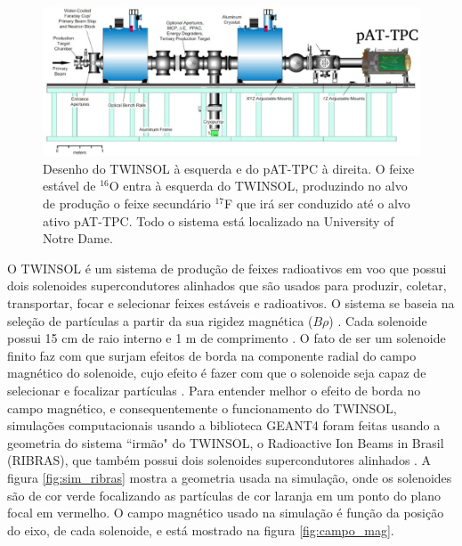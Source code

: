 \documentclass[a4paper,12pt,oneside]{book}
\begin{document}
\begin{figure}[H]
    \centering
    \includegraphics[scale = 0.35]{figs/poster3.jpeg}
    \caption{Desenho do TWINSOL à esquerda e do pAT-TPC à direita. O feixe estável de $^{16}$O entra à esquerda do TWINSOL, produzindo no alvo de produção o feixe secundário $^{17}$F que irá ser conduzido até o alvo ativo pAT-TPC. Todo o sistema está localizado na University of Notre Dame.}
    \label{fig:twinsol+pattpc}
\end{figure}

\par O TWINSOL é um sistema de produção de feixes radioativos em voo que possui dois solenoides supercondutores alinhados que são usados para produzir, coletar, transportar, focar e selecionar feixes estáveis e radioativos. O sistema se baseia na seleção de partículas a partir da sua rigidez magnética ($B\rho$) \cite{twinsol, ribras_leo, zamora_mater}. Cada solenoide possui 15 cm de raio interno e 1 m de comprimento \cite{twinsol}. O fato de ser um solenoide finito faz com que surjam efeitos de borda na componente radial do campo magnético do solenoide, cujo efeito é fazer com que o solenoide seja capaz de selecionar e focalizar partículas \cite{ribras_leo}. Para entender melhor o efeito de borda no campo magnético, e consequentemente o funcionamento do TWINSOL, simulações computacionais usando a biblioteca GEANT4 \cite{geant4} foram feitas usando a geometria do sistema ``irmão" do TWINSOL, o Radioactive Ion Beams in Brasil (RIBRAS), que também possui dois solenoides supercondutores alinhados \cite{ribras_leo, ribras}. A figura \ref{fig:sim_ribras} mostra a geometria usada na simulação, onde os solenoides são de cor verde focalizando as partículas de cor laranja em um ponto do plano focal em vermelho. O campo magnético usado na simulação é função da posição do eixo, de cada solenoide, e está mostrado na figura \ref{fig:campo_mag}.


\end{document}
